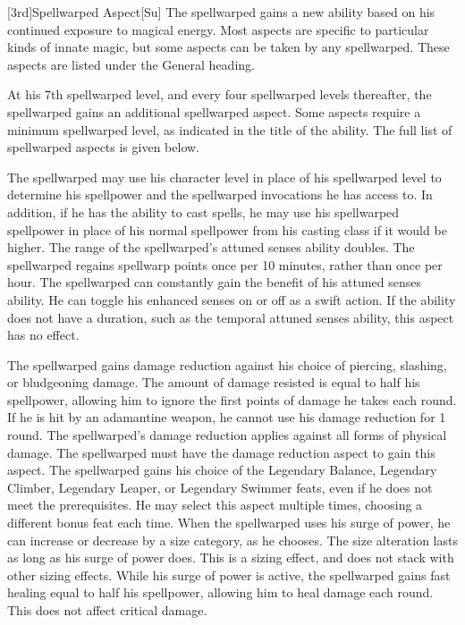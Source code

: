 [3rd]{Spellwarped Aspect}[Su]
The spellwarped gains a new ability based on his continued exposure to magical energy.
Most aspects are specific to particular kinds of innate magic, but some aspects can be taken by any spellwarped.
These aspects are listed under the General heading.

At his 7th spellwarped level, and every four spellwarped levels thereafter, the spellwarped gains an additional spellwarped aspect.
Some aspects require a minimum spellwarped level, as indicated in the title of the ability.
The full list of spellwarped aspects is given below.

    The spellwarped may use his character level in place of his spellwarped level to determine his spellpower and the spellwarped invocations he has access to.
    In addition, if he has the ability to cast spells, he may use his spellwarped spellpower in place of his normal spellpower from his casting class if it would be higher.
    The range of the spellwarped's attuned senses ability doubles.
    The spellwarped regains spellwarp points once per 10 minutes, rather than once per hour.
    The spellwarped can constantly gain the benefit of his attuned senses ability.
    He can toggle his enhanced senses on or off as a swift action.
    If the ability does not have a duration, such as the temporal attuned senses ability, this aspect has no effect.

    The spellwarped gains damage reduction against his choice of piercing, slashing, or bludgeoning damage.
    The amount of damage resisted is equal to half his spellpower, allowing him to ignore the first points of damage he takes each round.
    If he is hit by an adamantine weapon, he cannot use his damage reduction for 1 round.
    The spellwarped's damage reduction applies against all forms of physical damage.
    The spellwarped must have the damage reduction aspect to gain this aspect.
    The spellwarped gains his choice of the Legendary Balance, Legendary Climber, Legendary Leaper, or Legendary Swimmer feats, even if he does not meet the prerequisites.
    He may select this aspect multiple times, choosing a different bonus feat each time.
    When the spellwarped uses his surge of power, he can increase or decrease by a size category, as he chooses.
    The size alteration lasts as long as his surge of power does.
    This is a sizing effect, and does not stack with other sizing effects.
    While his surge of power is active, the spellwarped gains fast healing equal to half his spellpower, allowing him to heal damage each round.
    This does not affect critical damage.

